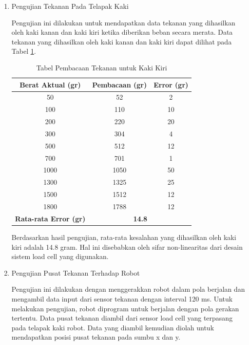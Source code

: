\begin{enumerate}[label=\Alph*.]
    \item Pengujian Tekanan Pada Telapak Kaki
    \label{subsec:hasil-pembahasan-tekanan}

        \hspace*{1em} Pengujian ini dilakukan untuk mendapatkan data tekanan yang dihasilkan oleh kaki kanan dan kaki kiri ketika diberikan beban secara merata. Data tekanan yang dihasilkan oleh kaki kanan dan kaki kiri dapat dilihat pada Tabel \ref{tab:pengukuran_berat_kaki}.

        \begin{table}[h!]
            \centering
            \caption{Tabel Pembacaan Tekanan untuk Kaki Kiri}
            \begin{tabular}{|c|c|c|}
                \hline
                \textbf{Berat Aktual (gr)} & \textbf{Pembacaan (gr)} & \textbf{Error (gr)} \\
                \hline
                50    & 52    & 2   \\
                100   & 110   & 10  \\
                200   & 220   & 20  \\
                300   & 304   & 4   \\
                500   & 512   & 12  \\
                700   & 701   & 1   \\
                1000  & 1050  & 50  \\
                1300  & 1325  & 25  \\
                1500  & 1512  & 12  \\
                1800  & 1788  & 12  \\
                \hline
                \textbf{Rata-rata Error (gr)} & \multicolumn{2}{c|}{\textbf{14.8}} \\
                \hline
            \end{tabular}
            \label{tab:pengukuran_berat_kaki}
        \end{table}

        \hspace*{1em} Berdasarkan hasil pengujian, rata-rata kesalahan yang dihasilkan oleh kaki kiri adalah 14.8 gram. Hal ini disebabkan oleh sifar non-linearitas dari desain sistem load cell yang digunakan.

    \item Pengujian Pusat Tekanan Terhadap Robot
    \label{subsec:hasil-pembahasan-pusat-tekanan}

        \hspace*{1em} Pengujian ini dilakukan dengan menggerakkan robot dalam pola berjalan dan mengambil data input dari sensor tekanan dengan interval 120 ms. Untuk melakukan pengujian, robot diprogram untuk berjalan dengan pola gerakan tertentu. Data pusat tekanan diambil dari sensor load cell yang terpasang pada telapak kaki robot. Data yang diambil kemudian diolah untuk mendapatkan posisi pusat tekanan pada sumbu x dan y.


\end{enumerate}
